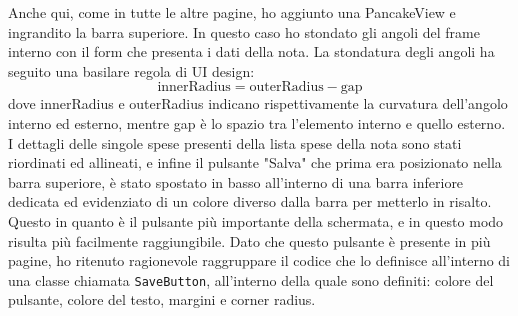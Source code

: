Anche qui, come in tutte le altre pagine, ho aggiunto una PancakeView e ingrandito la barra superiore. In questo caso ho stondato gli angoli del frame interno con il form che presenta i dati della nota. La stondatura degli angoli ha seguito una basilare regola di UI design:
\begin{equation*}
    \text{innerRadius} = \text{outerRadius}-\text{gap}
\end{equation*}
\noindent dove innerRadius e outerRadius indicano rispettivamente la curvatura dell'angolo interno ed esterno, mentre gap è lo spazio tra l'elemento interno e quello esterno.\\
I dettagli delle singole spese presenti della lista spese della nota sono stati riordinati ed allineati, e infine il pulsante "Salva" che prima era posizionato nella barra superiore, è stato spostato in basso all'interno di una barra inferiore dedicata ed evidenziato di un colore diverso dalla barra per metterlo in risalto. Questo in quanto è il pulsante più importante della schermata, e in questo modo risulta più facilmente raggiungibile. Dato che questo pulsante è presente in più pagine, ho ritenuto ragionevole raggruppare il codice che lo definisce all'interno di una classe chiamata \verb|SaveButton|, all'interno della quale sono definiti: colore del pulsante, colore del testo, margini e corner radius.

